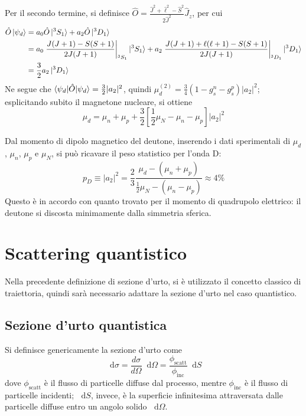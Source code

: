\documentclass[11pt, a4paper]{scrartcl}
\theoremstyle{style}
\newcommand{\dd}{\mathop{}\!\mathrm{d}}
\newcommand*\Eval[3]{\left.#1\right\rvert_{#2}^{#3}}
\numberwithin{equation}{subsection}
\begin{document}
\begin{itemize}
Per il secondo termine, si definisce $\hat{O} = \frac{\hat{J}^2 + \hat{\ell }^2 - \hat{S}^2}{2 \hat{J}^2} \hat{J}_z$, per cui
\[
	\begin{split}
		\hat{O} \ket{\psi _d} &= a_0 \hat{O}\ket{^3S_1}  + a_2 \hat{O} \ket{^3D_1} \\
				      &= a_0 \Eval{\frac{J(J+1) - S(S+1)}{2J(J+1)}}{^3S_1}{}\ket{^3S_1}  + a_2 \Eval{\frac{J(J+1)+\ell (\ell +1) - S(S+1)}{2J(J+1)}}{^3D_1}{} \ket{^3D_1} \\
				      &= \frac{3}{2}a_2 \ket{^3D_1} 
	\end{split}
\] 
Ne segue che $\braket{\psi _d|\hat{O}|\psi _d} = \frac{3}{2} \lvert a_2 \rvert ^2$, quindi $\mu _d^{(2)} = \frac{3}{4} \left(1- g_s^n - g_s^p\right) \lvert a_2 \rvert ^2$; esplicitando subito il magnetone nucleare, si ottiene
\[
\mu _d = \mu _n + \mu _p + \frac{3}{2} \left[ \frac{1}{2}\mu _N - \mu _n - \mu _p \right] \lvert a_2 \rvert ^2
\] 
\end{itemize}
Dal momento di dipolo magnetico del deutone, inserendo i dati sperimentali di $\mu _d$, $\mu _n$, $\mu _p$ e $ \mu _N$, si pu\`o ricavare il peso statistico per l'onda D:
\begin{equation}
	p_D \equiv \lvert a_2 \rvert ^2 = \frac{2}{3} \frac{\mu _d - (\mu _n + \mu _p)}{\frac{1}{2}\mu _N - (\mu _n - \mu _p)} \approx 4\%
\end{equation}
Questo \`e in accordo con quanto trovato per il momento di quadrupolo elettrico: il deutone si discosta minimamente dalla simmetria sferica.


\newpage

\section{Scattering quantistico}

Nella precedente definizione di sezione d'urto, si \`e utilizzato il concetto classico di traiettoria, quindi sar\`a necessario adattare la sezione d'urto nel caso quantistico.

\subsection{Sezione d'urto quantistica}

Si definisce genericamente la sezione d'urto come
\begin{equation}
	\dd \sigma  = \frac{d \sigma }{d \Omega } \dd \Omega  = \frac{\phi _\text{scatt}}{\phi _\text{inc}} \dd S
\end{equation}
dove $\phi _\text{scatt}$ \`e il flusso di particelle diffuse dal processo, mentre $\phi _\text{inc}$ \`e il flusso di particelle incidenti; $\dd S$, invece, \`e la superficie infinitesima attraversata dalle particelle diffuse entro un angolo solido $\dd \Omega $.
\end{document}
